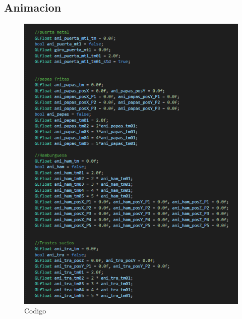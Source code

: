 \documentclass[letter,12pt]{article}
\begin{document}
\subsection{Animacion}
\begin{figure}[H]
		\includegraphics[scale=1]{img/img6}
		\centering
		\caption{Codigo}
	\end{figure}
\end{document}
